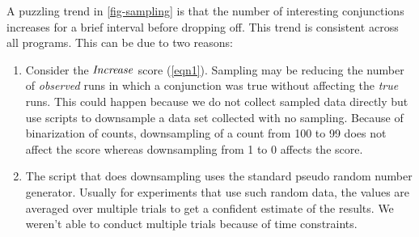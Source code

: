 A puzzling trend in \autoref{fig-sampling} is that the number of interesting conjunctions increases for a brief interval before dropping off.  This trend is consistent across all programs.  This can be due to two reasons:
\begin{enumerate}
\item Consider the $\mathit{Increase}$ score (\autoref{eqn1}).  Sampling may be reducing the number of \emph{observed} runs in which a conjunction was true without affecting the \emph{true} runs.  This could happen because we do not collect sampled data directly but use scripts to downsample a data set collected with no sampling.  Because of binarization of counts, downsampling of a count from 100 to 99 does not affect the score whereas downsampling from 1 to 0 affects the score.
\item The script that does downsampling uses the standard pseudo random number generator.  Usually for experiments that use such random data, the values are averaged over multiple trials to get a confident estimate of the results.  We weren't able to conduct multiple trials because of time constraints.
\end{enumerate}
